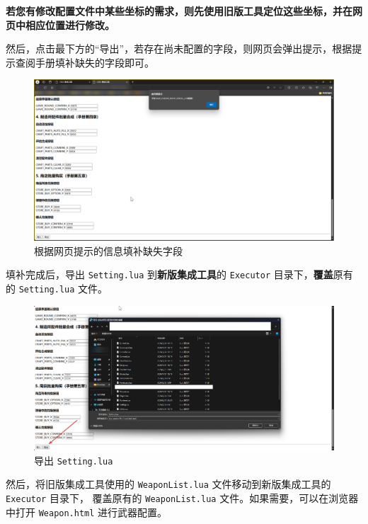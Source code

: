 \textbf{\color{red}若您有修改配置文件中某些坐标的需求，则先使用旧版工具定位这些坐标，并在网页中相应位置进行修改。}

然后，点击最下方的“导出”，若存在尚未配置的字段，则网页会弹出提示，根据提示查阅手册填补缺失的字段即可。

\begin{figure}[H]
    \Centering
    \includegraphics[width=\textwidth]{docs/assets/update/export_error}
    \caption{根据网页提示的信息填补缺失字段}
\end{figure}

填补完成后，导出 \lstinline{Setting.lua} 到\textbf{\color{red}新版集成工具}的 \lstinline{Executor} 目录下，\textbf{\color{red}覆盖}原有的 \lstinline{Setting.lua} 文件。

\begin{figure}[H]
    \Centering
    \includegraphics[width=\textwidth]{docs/assets/update/override_setting}
    \caption{导出 \lstinline{Setting.lua}}
\end{figure}

然后，将旧版集成工具使用的 \lstinline{WeaponList.lua} 文件移动到新版集成工具的 \lstinline{Executor} 目录下，
覆盖原有的 \lstinline{WeaponList.lua} 文件。如果需要，可以在浏览器中打开 \lstinline{Weapon.html} 进行武器配置。


